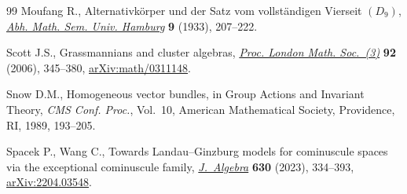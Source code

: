 \documentclass[10pt,a4paper]{amsart}
\numberwithin{equation}{section}
\theoremstyle{definition}
\begin{document}
\begin{thebibliography}{99}
Moufang R., Alternativk\"orper und der {S}atz vom vollst\"andigen {V}ierseit
 {$(D_9)$}, \href{https://doi.org/10.1007/BF02940648}{\textit{Abh. Math. Sem. Univ. Hamburg}} \textbf{9} (1933),
 207--222.

Scott J.S., Grassmannians and cluster algebras, \href{https://doi.org/10.1112/S0024611505015571}{\textit{Proc. London Math.
 Soc.~(3)}} \textbf{92} (2006), 345--380, \href{https://arxiv.org/abs/math/0311148}{arXiv:math/0311148}.

Snow D.M., Homogeneous vector bundles, in Group {A}ctions and {I}nvariant
 {T}heory, \textit{CMS Conf. Proc.}, Vol.~10, American Mathematical Society,
 Providence, RI, 1989, 193--205.

Spacek P., Wang C., Towards {L}andau--{G}inzburg models for cominuscule spaces
 via the exceptional cominuscule family, \href{https://doi.org/10.1016/j.jalgebra.2023.03.039}{\textit{J.~Algebra}} \textbf{630}
 (2023), 334--393, \href{https://arxiv.org/abs/2204.03548}{arXiv:2204.03548}.

\end{thebibliography}
\end{document}
